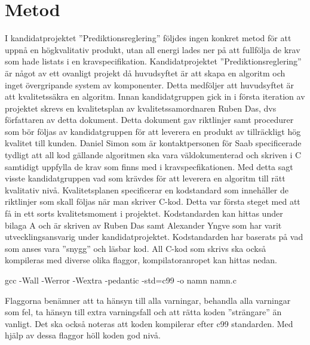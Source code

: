 \section{Metod}

I kandidatprojektet ''Prediktionsreglering'' följdes ingen konkret metod för att uppnå en högkvalitativ produkt, utan all energi lades ner på att fullfölja de krav som hade listats i en kravspecifikation.
\newline
\newline
Kandidatprojektet ''Prediktionsreglering'' är något av ett ovanligt projekt då huvudsyftet är att skapa en algoritm och inget övergripande system av komponenter. Detta medföljer att huvudsyftet är att kvalitetssäkra en algoritm.
\newline
\newline
Innan kandidatgruppen gick in i första iteration av projektet skrevs en kvalitetsplan av kvalitetssamordnaren Ruben Das, dvs författaren av detta dokument. Detta dokument gav riktlinjer samt procedurer som bör följas av kandidatgruppen för att leverera en produkt av tillräckligt hög kvalitet till kunden. Daniel Simon som är kontaktpersonen för Saab specificerade tydligt att all kod gällande algoritmen ska vara väldokumenterad och skriven i C samtidigt uppfylla de krav som finns med i kravspecfikationen. Med detta sagt visste kandidatgruppen vad som krävdes för att leverera en algoritm till rätt kvalitativ nivå. Kvalitetsplanen specificerar en kodstandard som innehåller de riktlinjer som skall följas när man skriver C-kod. Detta var första steget med att få in ett sorts kvalitetsmoment i projektet. Kodstandarden kan hittas under bilaga A och är skriven av Ruben Das samt Alexander Yngve som har varit utvecklingsansvarig under kandidatprojektet. Kodstandarden har baserats på vad som anses vara ''snygg'' och läsbar kod. All C-kod som skrivs ska också kompileras med diverse olika flaggor, kompilatoranropet kan hittas nedan.
\begin{tcolorbox}[boxrule=1pt,leftrule=5pt,arc=0pt,auto outer arc]
gcc -Wall -Werror -Wextra -pedantic -std=c99 -o namn namn.c
\end{tcolorbox}
\noindent Flaggorna benämner att ta hänsyn till alla varningar, behandla alla varningar som fel, ta hänsyn till extra varningsfall och att rätta koden ''strängare'' än vanligt. Det ska också noteras att koden kompilerar efter c99 standarden. Med hjälp av dessa flaggor höll koden god nivå.
\newline
\newline
